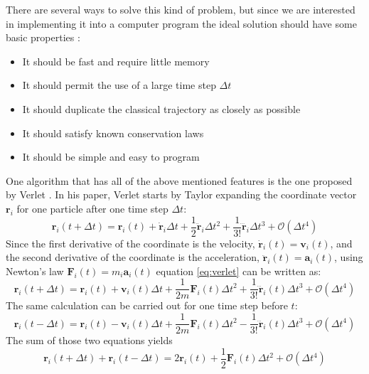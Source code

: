 \documentclass[12pt]{article}
\begin{document}
There are several ways to solve this kind of problem, but since we are interested in implementing it into a computer program the ideal solution
should have some basic properties \cite{Allen1989}:
\begin{itemize}
    \item It should be fast and require little memory
    \item It should permit the use of a large time step $\Delta t$
    \item It should duplicate the classical trajectory as closely as possible
    \item It should satisfy known conservation laws
    \item It should be simple and easy to program
\end{itemize}
One algorithm that has all of the above mentioned features is the one proposed by Verlet \cite{Verlet1967}. In his paper, Verlet starts by Taylor
expanding the coordinate vector $\mathbf{r}_i$ for one particle after one time step $\Delta t$:
\begin{equation}
    \label{eq:verlet}
    \mathbf{r}_i(t+\Delta t) = \mathbf{r}_i(t) + \dot{\mathbf{r}}_i \Delta t + \frac12 \ddot{\mathbf{r}}_i \Delta t^2 + \frac1{3!} \dddot{\mathbf{r}}_i \Delta t^3 +
    \mathcal{O}(\Delta t^4)
\end{equation}
Since the first derivative of the coordinate is the velocity, $\dot{\mathbf{r}}_i(t) = \mathbf{v}_i(t)$, and the second derivative of the coordinate 
is the acceleration, $\ddot{\mathbf{r}}_i(t) = \mathbf{a}_i(t)$, using Newton's law $\mathbf{F}_i(t) = m_i \mathbf{a}_i(t)$ equation \eqref{eq:verlet} 
can be written as:
\begin{equation}
    \label{eq:verletnew}
    \mathbf{r}_i(t+\Delta t) = \mathbf{r}_i(t) + {\mathbf{v}}_i(t) \Delta t + \frac1{2m} {\mathbf{F}}_i(t) \Delta t^2 + \frac1{3!} \dddot{\mathbf{r}}_i(t)
    \Delta t^3+\mathcal{O}(\Delta t^4)
\end{equation}
The same calculation can be carried out for one time step before $t$:
\begin{equation}
    \label{eq:verletnewminus}
    \mathbf{r}_i(t-\Delta t) = \mathbf{r}_i(t) - {\mathbf{v}}_i(t) \Delta t + \frac1{2m} {\mathbf{F}}_i(t) \Delta t^2 - \frac1{3!} \dddot{\mathbf{r}}_i(t) \Delta t^3+
    \mathcal{O}(\Delta t^4)
\end{equation}
The sum of those two equations yields
\begin{equation}
    \mathbf{r}_i(t+\Delta t) + \mathbf{r}_i(t-\Delta t) = 2\mathbf{r}_i(t) + \frac1{2} {\mathbf{F}}_i(t) \Delta t^2 + \mathcal{O}(\Delta t^4)
\end{equation}
\end{document}
